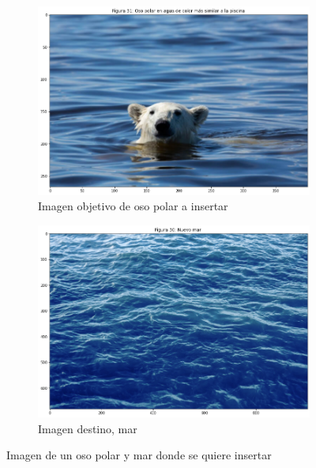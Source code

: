 \documentclass[11pt,twoside,titlepage,a4paper]{article}
\numberwithin{equation}{section} %
\theoremstyle{usual}
\begin{document}
\begin{figure}[h]
    \centering
    \begin{subfigure}[b]{.45\textwidth}
        \centering
        \includegraphics[width=\textwidth]{imagenes/PoissonImageEditing_cell_40_output_1.png}
        \caption{Imagen objetivo de oso polar a insertar}
    \end{subfigure}%
    \begin{subfigure}[b]{.45\textwidth}
        \centering
        \includegraphics[width=\textwidth]{imagenes/PoissonImageEditing_cell_40_output_0.png}
        \caption{Imagen destino, mar}

    \end{subfigure}
    \caption{Imagen de un oso polar y mar donde se quiere insertar}
    \label{fig:copiadoPristinoElementosOsoPolarYMar}
\end{figure}
\end{document}
